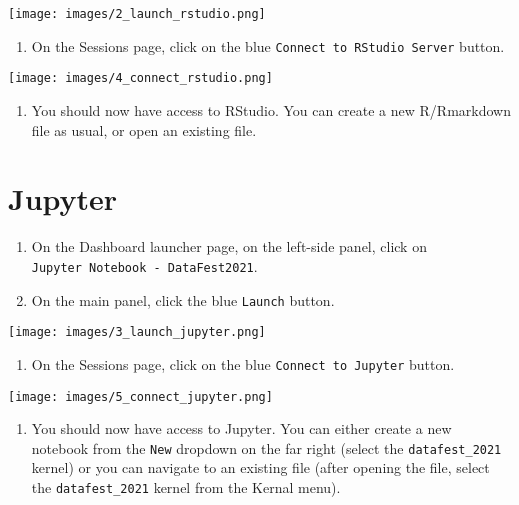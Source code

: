 \documentclass[]{book}
\providecommand{\tightlist}{%
  \setlength{\itemsep}{0pt}\setlength{\parskip}{0pt}}
\begin{document}
\texttt{[image: images/2\_launch\_rstudio.png]}

\begin{enumerate}
\def\labelenumi{\arabic{enumi}.}
\setcounter{enumi}{3}
\tightlist
\item
  On the Sessions page, click on the blue \texttt{Connect\ to\ RStudio\ Server} button.
\end{enumerate}

\texttt{[image: images/4\_connect\_rstudio.png]}

\begin{enumerate}
\def\labelenumi{\arabic{enumi}.}
\setcounter{enumi}{4}
\tightlist
\item
  You should now have access to RStudio. You can create a new R/Rmarkdown file as usual, or open an existing file.
\end{enumerate}

\hypertarget{jupyter}{%
\section{Jupyter}\label{jupyter}}

\begin{enumerate}
\def\labelenumi{\arabic{enumi}.}
\setcounter{enumi}{1}
\tightlist
\item
  On the Dashboard launcher page, on the left-side panel, click on \texttt{Jupyter\ Notebook\ -\ DataFest2021}.
\item
  On the main panel, click the blue \texttt{Launch} button.
\end{enumerate}

\texttt{[image: images/3\_launch\_jupyter.png]}

\begin{enumerate}
\def\labelenumi{\arabic{enumi}.}
\setcounter{enumi}{3}
\tightlist
\item
  On the Sessions page, click on the blue \texttt{Connect\ to\ Jupyter} button.
\end{enumerate}

\texttt{[image: images/5\_connect\_jupyter.png]}

\begin{enumerate}
\def\labelenumi{\arabic{enumi}.}
\setcounter{enumi}{4}
\tightlist
\item
  You should now have access to Jupyter. You can either create a new notebook from the \texttt{New} dropdown on the far right (select the \texttt{datafest\_2021} kernel) or you can navigate to an existing file (after opening the file, select the \texttt{datafest\_2021} kernel from the Kernal menu).
\end{enumerate}
\end{document}
